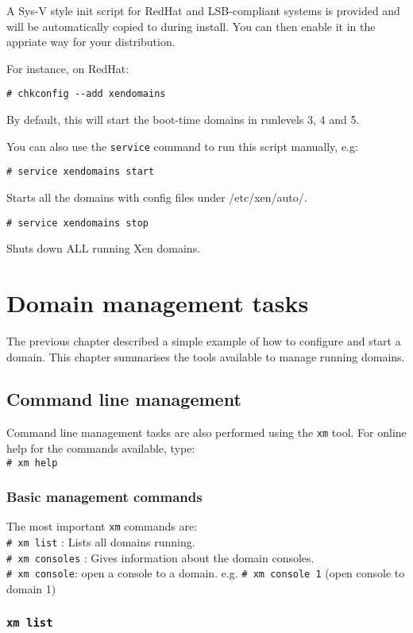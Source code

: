 \documentclass[11pt,twoside,final,openright]{xenstyle}
\begin{document}
A Sys-V style init script for RedHat and LSB-compliant systems is
provided and will be automatically copied to 
during install.  You can then enable it in the appriate way for your
distribution.

For instance, on RedHat:

\verb_# chkconfig --add xendomains_

By default, this will start the boot-time domains in runlevels 3, 4
and 5.

You can also use the {\tt service} command to run this script manually, e.g:

\verb_# service xendomains start_

Starts all the domains with config files under /etc/xen/auto/.

\verb_# service xendomains stop_

Shuts down ALL running Xen domains.


\chapter{Domain management tasks}

The previous chapter described a simple example of how to configure
and start a domain.  This chapter summarises the tools available to
manage running domains.

\section{Command line management}

Command line management tasks are also performed using the {\tt xm}
tool.  For online help for the commands available, type:\\
\verb_# xm help_

\subsection{Basic management commands}

The most important {\tt xm} commands are: \\
\verb_# xm list_ : Lists all domains running. \\
\verb_# xm consoles_ : Gives information about the domain consoles. \\
\verb_# xm console_: open a console to a domain.
e.g. \verb_# xm console 1_ (open console to domain 1)

\subsection{\tt xm list}
\end{document}
